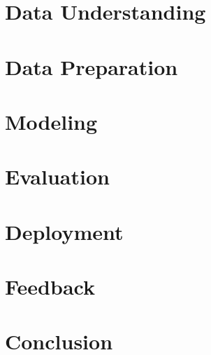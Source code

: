 \documentclass[a4paper,11pt]{report}
\begin{document}
\chapter{Data Understanding}
\label{ch:data-understanding}


\chapter{Data Preparation}
\label{ch:data-preparation}


\chapter{Modeling}
\label{ch:modeling}


\chapter{Evaluation}
\label{ch:evaluation}


\chapter{Deployment}
\label{ch:deployment}


\chapter{Feedback}
\label{ch:feedback}


\chapter{Conclusion}
\label{ch:conclusion}

\end{document}
